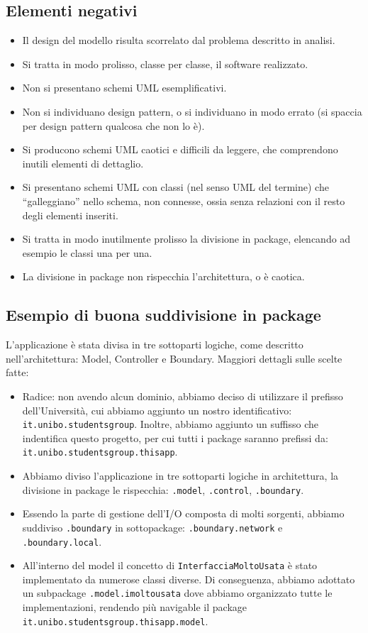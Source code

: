 \documentclass[a4paper,12pt]{report}
\begin{document}
\subsection*{Elementi negativi}
\begin{itemize}
	\item Il design del modello risulta scorrelato dal problema descritto in analisi.
	\item Si tratta in modo prolisso, classe per classe, il software realizzato.
	\item Non si presentano schemi UML esemplificativi.
	\item Non si individuano design pattern, o si individuano in modo errato (si spaccia per design pattern qualcosa che non lo è).
	\item Si producono schemi UML caotici e difficili da leggere, che comprendono inutili elementi di dettaglio.
	\item Si presentano schemi UML con classi (nel senso UML del termine) che ``galleggiano'' nello schema, non connesse, ossia senza relazioni con il resto degli elementi inseriti.
	\item Si tratta in modo inutilmente prolisso la divisione in package, elencando ad esempio le classi una per una.
	\item La divisione in package non rispecchia l'architettura, o è caotica.
\end{itemize}

\subsection*{Esempio di buona suddivisione in package}
L'applicazione è stata divisa in tre sottoparti logiche, come descritto nell'architettura: Model, Controller e Boundary. Maggiori dettagli sulle scelte fatte:
\begin{itemize}
 \item Radice: non avendo alcun dominio, abbiamo deciso di utilizzare il prefisso dell'Università, cui abbiamo aggiunto un nostro identificativo: \texttt{it.unibo.studentsgroup}. Inoltre, abbiamo aggiunto un suffisso che indentifica questo progetto, per cui tutti i package saranno prefissi da: \texttt{it.unibo.studentsgroup.thisapp}.
 \item Abbiamo diviso l'applicazione in tre sottoparti logiche in architettura, la divisione in package le rispecchia: \texttt{.model}, \texttt{.control}, \texttt{.boundary}. 
 \item Essendo la parte di gestione dell'I/O composta di molti sorgenti, abbiamo suddiviso \texttt{.boundary} in sottopackage: \texttt{.boundary.network} e \texttt{.boundary.local}.
 \item All'interno del model il concetto di \texttt{InterfacciaMoltoUsata} è stato implementato da numerose classi diverse. Di conseguenza, abbiamo adottato un subpackage \texttt{.model.imoltousata} dove abbiamo organizzato tutte le implementazioni, rendendo più navigable il package \texttt{it.unibo.studentsgroup.thisapp.model}.
\end{itemize}
\end{document}
